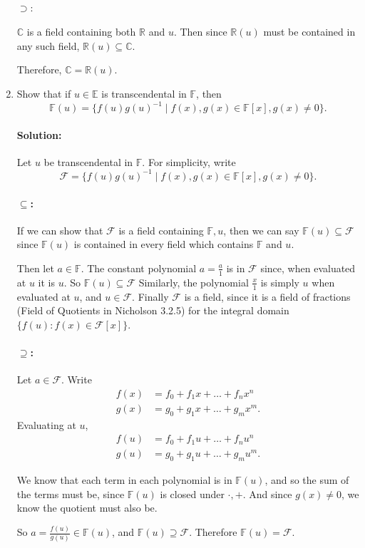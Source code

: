 \documentclass{article}
\begin{document}
\begin{enumerate}
    \paragraph{$\supset :$ } $\mathbb{C}$ is a field containing both $\mathbb{R}$ and $u$. Then since $\mathbb{R}(u)$ must be contained in any such field,
    $\mathbb{R}(u)\subseteq \mathbb{C}$.

    Therefore, $\mathbb{C}=\mathbb{R}(u).$

\item Show that if $u\in\mathbb{E}$ is transcendental in $\mathbb{F}$, then
\[\mathbb{F}(u)=\{f(u)g(u)^{-1}\mid f(x),g(x)\in\mathbb{F}[x],g(x)\neq0\}.\]

\paragraph{Solution: } Let $u$ be transcendental in $\mathbb{F}$.
For simplicity, write \[ \mathcal{F}=\{f(u)g(u)^{-1}\mid f(x),g(x)\in\mathbb{F}[x],g(x)\neq0\} .\] 

\paragraph{$\subseteq$: } If we can show that $\mathcal{F}$ is a field containing $\mathbb{F},u$, then we can say $\mathbb{F}(u)\subseteq \mathcal{F}$ since
$\mathbb{F}(u)$ is contained in every field which contains $\mathbb{F}$ and $u$.

Then let $a\in \mathbb{F}$. The constant polynomial $a=\frac{a}{1}$ is in $\mathcal{F}$ since, when evaluated at $u$ it is $u$. So $\mathbb{F}(u)\subseteq \mathcal{F}$
Similarly, the polynomial $\frac{x}{1}$ is simply $u$ when evaluated at $u$, and $u\in \mathcal{F}$.
Finally $\mathcal{F}$ is a field, since it is a field of fractions (Field of Quotients in Nicholson 3.2.5) for the integral domain $\{f(u):f(x)\in \mathcal{F}[x]\} $.

\paragraph{$\supseteq $: }Let $a\in \mathcal{F}$. 
Write
\begin{align*}
    f(x)&=f_0+f_1 x+\ldots+f_nx^{n}\\
    g(x)&= g_0+g_1x+\ldots+g_mx^{m}
.\end{align*}
Evaluating at $u$,
\begin{align*}
    f(u)&=f_0+f_1 u+\ldots+f_nu^{n}\\
    g(u)&= g_0+g_1u+\ldots+g_mu^{m}
.\end{align*}

We know that each term in each polynomial is in $\mathbb{F}(u) $, and so the sum of the terms must be, since $\mathbb{F}(u)$ is closed under $\cdot,+$.
And since $g(x)\neq 0$, we know the quotient must also be.

So $a=\frac{f(u)}{g(u)}\in \mathbb{F}(u)$, and $\mathbb{F}(u)\supseteq \mathcal{F}.$ Therefore $\mathbb{F}(u)=\mathcal{F}$.
\end{enumerate}
\end{document}
